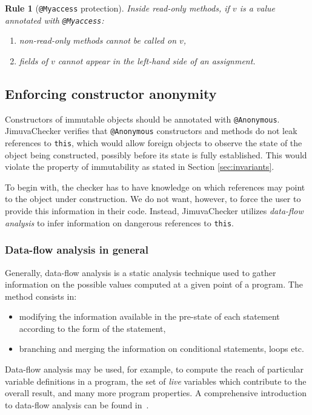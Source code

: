 \documentclass{pracamgr}
\theoremstyle{break}
\theoremstyle{break}
\theoremstyle{break}
\newtheorem{verrule}{Rule}
\begin{document}
\begin{verrule}[\texttt{@Myaccess} protection]
  Inside read-only methods, if $v$ is a value annotated with
  \texttt{@Myaccess}:
  \begin{enumerate}
  \item non-read-only methods cannot be called on $v$, 
  \item fields of $v$ cannot appear in the left-hand side of an
    assignment.
  \end{enumerate}
\end{verrule}

\subsection{Enforcing constructor anonymity}
\label{sec:chk:anon}

Constructors of immutable objects should be annotated with
\texttt{@Anonymous}. JimuvaChecker verifies that \texttt{@Anonymous}
constructors and methods do not leak references to \texttt{this},
which would allow foreign objects to observe the state of the object
being constructed, possibly before its state is fully
established. This would violate the property of immutability as stated
in Section \ref{sec:invariants}. 

To begin with, the checker has to have knowledge on which references
may point to the object under construction. We do not want, however,
to force the user to provide this information in their code. Instead,
JimuvaChecker utilizes \emph{data-flow analysis} to infer information on
dangerous references to \texttt{this}.

\subsubsection{Data-flow analysis in general} 

Generally, data-flow analysis is a static analysis technique used to
gather information on the possible values computed at a given point of
a program. The method consists in:
\begin{itemize}
\item modifying the information available in the pre-state of each
  statement according to the form of the statement, 
\item branching and merging the information on conditional statements,
  loops etc.
\end{itemize}
Data-flow analysis may be used, for example, to compute the reach of
particular variable definitions in a program, the set of \emph{live}
variables which contribute to the overall result, and many more
program properties. A comprehensive introduction to data-flow analysis
can be found in~\cite{dataflow}. 
\end{document}
